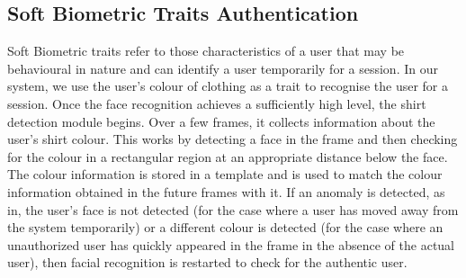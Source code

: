 \documentclass[12pt]{article}			%
\begin{document}
\subsection{Soft Biometric Traits Authentication}
Soft Biometric traits refer to those characteristics of a user that may be behavioural in nature and can identify a user temporarily for a session. In our system, we use the user's colour of clothing as a trait to recognise the user for a session. Once the face recognition achieves a sufficiently high level, the shirt detection module begins. Over a few frames, it collects information about the user's shirt colour. This works by detecting a face in the frame and then checking for the colour in a rectangular region at an appropriate distance below the face. The colour information is stored in a template and is used to match the colour information obtained in the future frames with it. If an anomaly is detected, as in, the user's face is not detected (for the case where a user has moved away from the system temporarily) or a different colour is detected (for the case where an unauthorized user has quickly appeared in the frame in the absence of the actual user), then facial recognition is restarted to check for the authentic user.
\end{document}
